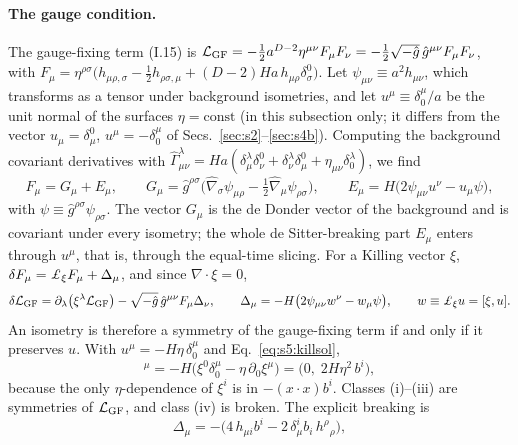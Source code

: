 \documentclass[aps,prd,onecolumn,10pt,nofootinbib,floatfix]{revtex4-2}
\newcommand{\eqI}[1]{(I.#1)}
\begin{document}
\paragraph*{The gauge condition.}
The gauge-fixing term \eqI{15} is
$\mathcal{L}_{\rm GF}=-\frac12a^{D-2}\eta^{\mu\nu}F_\mu F_\nu=-\frac12\sqrt{-\hat g}\,\hat g^{\mu\nu}F_\mu F_\nu$, with
$F_\mu=\eta^{\rho\sigma}\big(h_{\mu\rho,\sigma}-\frac12h_{\rho\sigma,\mu}+(D-2)Ha\,h_{\mu\rho}\delta^0_\sigma\big)$.
Let $\psi_{\mu\nu}\equiv a^2h_{\mu\nu}$, which transforms as a tensor under background isometries, and let $u^\mu\equiv\delta^\mu_0/a$ be the unit normal of the surfaces $\eta=\text{const}$ (in this subsection only; it differs from the vector $u_\mu=\delta^0_\mu$, $u^\mu=-\delta^\mu_0$ of Secs.~\ref{sec:s2}--\ref{sec:s4b}).
Computing the background covariant derivatives with $\hat\Gamma^\lambda_{\mu\nu}=Ha(\delta^\lambda_\mu\delta^0_\nu+\delta^\lambda_\nu\delta^0_\mu+\eta_{\mu\nu}\delta^\lambda_0)$, we find
\begin{equation}
F_\mu=G_\mu+E_\mu,\qquad
G_\mu=\hat g^{\rho\sigma}\big(\hat\nabla_\sigma\psi_{\mu\rho}-\tfrac12\hat\nabla_\mu\psi_{\rho\sigma}\big),\qquad
E_\mu=H\big(2\psi_{\mu\nu}u^\nu-u_\mu\psi\big),
\label{eq:s5:FGE}
\end{equation}
with $\psi\equiv\hat g^{\rho\sigma}\psi_{\rho\sigma}$.
The vector $G_\mu$ is the de Donder vector of the background and is covariant under every isometry; the whole de Sitter-breaking part $E_\mu$ enters through $u^\mu$, that is, through the equal-time slicing.
For a Killing vector $\xi$, $\delta F_\mu=\sfiveLie_\xi F_\mu+\Delta_\mu$, and since $\nabla\cdot\xi=0$,
\begin{equation}
\delta\sfiveLGF=\partial_\lambda\big(\xi^\lambda\sfiveLGF\big)-\sqrt{-\hat g}\,\hat g^{\mu\nu}F_\mu\Delta_\nu,\qquad
\Delta_\mu=-H\big(2\psi_{\mu\nu}w^\nu-w_\mu\psi\big),\qquad w\equiv\sfiveLie_\xi u=[\xi,u].
\label{eq:s5:deltaL}
\end{equation}
An isometry is therefore a symmetry of the gauge-fixing term if and only if it preserves $u$.
With $u^\mu=-H\eta\,\delta^\mu_0$ and Eq.~\eqref{eq:s5:killsol},
\begin{equation}
[\xi,u]^\mu=-H\big(\xi^0\delta^\mu_0-\eta\,\partial_0\xi^\mu\big)=\big(0,\;2H\eta^2\,b^i\big),
\label{eq:s5:xiu}
\end{equation}
because the only $\eta$-dependence of $\xi^i$ is in $-(x\cdot x)b^i$.
Classes (i)--(iii) are symmetries of $\mathcal{L}_{\rm GF}$, and class (iv) is broken.
The explicit breaking is
\begin{equation}
\Delta_\mu=-\big(4\,h_{\mu i}b^i-2\,\delta^i_\mu b_i\,h^\rho{}_\rho\big),
\label{eq:s5:Delta}
\end{equation}
\end{document}
